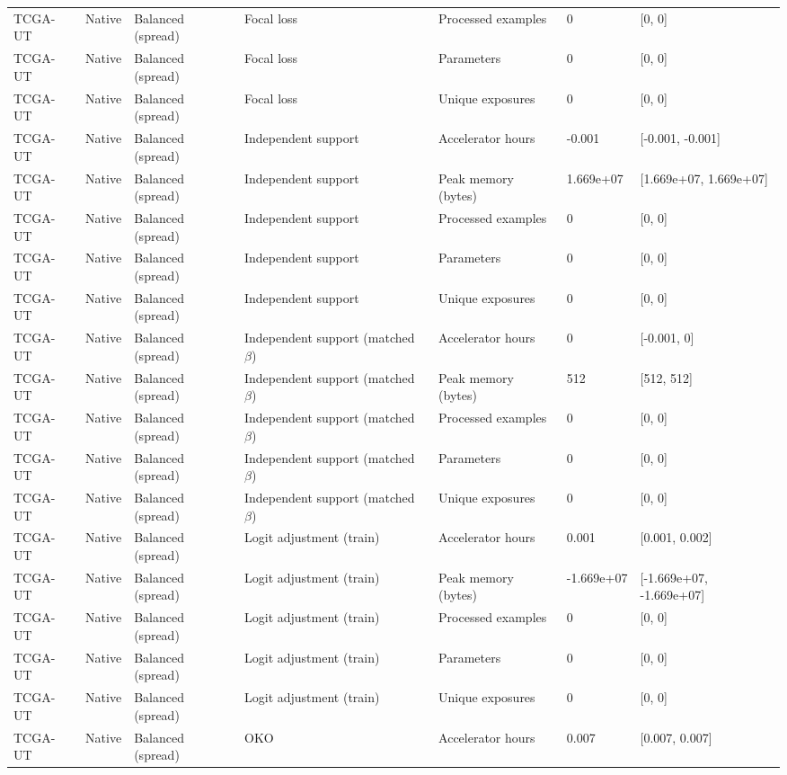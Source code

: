 \begin{longtable}{lllllll}
TCGA-UT & Native & Balanced (spread) & Focal loss & Processed examples & 0 & [0, 0] \\
TCGA-UT & Native & Balanced (spread) & Focal loss & Parameters & 0 & [0, 0] \\
TCGA-UT & Native & Balanced (spread) & Focal loss & Unique exposures & 0 & [0, 0] \\
TCGA-UT & Native & Balanced (spread) & Independent support & Accelerator hours & -0.001 & [-0.001, -0.001] \\
TCGA-UT & Native & Balanced (spread) & Independent support & Peak memory (bytes) & 1.669e+07 & [1.669e+07, 1.669e+07] \\
TCGA-UT & Native & Balanced (spread) & Independent support & Processed examples & 0 & [0, 0] \\
TCGA-UT & Native & Balanced (spread) & Independent support & Parameters & 0 & [0, 0] \\
TCGA-UT & Native & Balanced (spread) & Independent support & Unique exposures & 0 & [0, 0] \\
TCGA-UT & Native & Balanced (spread) & Independent support (matched $\beta$) & Accelerator hours & 0 & [-0.001, 0] \\
TCGA-UT & Native & Balanced (spread) & Independent support (matched $\beta$) & Peak memory (bytes) & 512 & [512, 512] \\
TCGA-UT & Native & Balanced (spread) & Independent support (matched $\beta$) & Processed examples & 0 & [0, 0] \\
TCGA-UT & Native & Balanced (spread) & Independent support (matched $\beta$) & Parameters & 0 & [0, 0] \\
TCGA-UT & Native & Balanced (spread) & Independent support (matched $\beta$) & Unique exposures & 0 & [0, 0] \\
TCGA-UT & Native & Balanced (spread) & Logit adjustment (train) & Accelerator hours & 0.001 & [0.001, 0.002] \\
TCGA-UT & Native & Balanced (spread) & Logit adjustment (train) & Peak memory (bytes) & -1.669e+07 & [-1.669e+07, -1.669e+07] \\
TCGA-UT & Native & Balanced (spread) & Logit adjustment (train) & Processed examples & 0 & [0, 0] \\
TCGA-UT & Native & Balanced (spread) & Logit adjustment (train) & Parameters & 0 & [0, 0] \\
TCGA-UT & Native & Balanced (spread) & Logit adjustment (train) & Unique exposures & 0 & [0, 0] \\
TCGA-UT & Native & Balanced (spread) & OKO & Accelerator hours & 0.007 & [0.007, 0.007] \\

\end{longtable}
